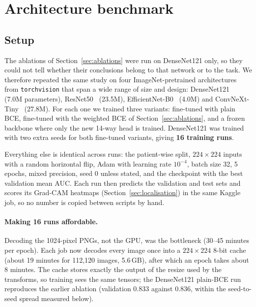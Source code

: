 
\section{Architecture benchmark}
\label{sec:benchmark}

\subsection{Setup}
The ablations of Section~\ref{sec:ablations} were run on DenseNet121 only, so they could not tell whether their conclusions belong to that network or to the task. We therefore repeated the same study on four ImageNet-pretrained architectures from \texttt{torchvision} that span a wide range of size and design:
DenseNet121~\cite{huang2017densenet} (7.0M parameters), ResNet50~\cite{he2016resnet} (23.5M), EfficientNet-B0~\cite{tan2019efficientnet} (4.0M) and ConvNeXt-Tiny~\cite{liu2022convnext} (27.8M).
For each one we trained three variants: fine-tuned with plain BCE, fine-tuned with the weighted BCE of Section~\ref{sec:ablations}, and a frozen backbone where only the new 14-way head is trained. DenseNet121 was trained with two extra seeds for both fine-tuned variants, giving \textbf{16 training runs}.

Everything else is identical across runs: the patient-wise split, $224\times224$ inputs with a random horizontal flip, Adam with learning rate $10^{-4}$, batch size 32, 5 epochs, mixed precision, seed 0 unless stated, and the checkpoint with the best validation mean AUC. Each run then predicts the validation and test sets and scores its Grad-CAM heatmaps (Section~\ref{sec:localisation}) in the same Kaggle job, so no number is copied between scripts by hand.

\paragraph{Making 16 runs affordable.} Decoding the 1024-pixel PNGs, not the GPU, was the bottleneck (30--45 minutes per epoch). Each job now decodes every image once into a $224\times224$ 8-bit cache (about 19 minutes for 112{,}120 images, 5.6\,GB), after which an epoch takes about 8 minutes. The cache stores exactly the output of the resize used by the transforms, so training sees the same tensors; the DenseNet121 plain-BCE run reproduces the earlier ablation (validation 0.833 against 0.836, within the seed-to-seed spread measured below).

